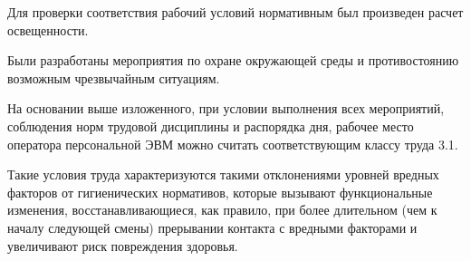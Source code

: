 Для проверки соответствия рабочий условий нормативным был произведен расчет освещенности.

Были разработаны мероприятия по охране окружающей среды и противостоянию возможным чрезвычайным ситуациям.

На основании выше изложенного, при условии выполнения всех мероприятий, соблюдения норм трудовой дисциплины и распорядка дня, рабочее место оператора персональной ЭВМ можно считать соответствующим классу труда 3.1.

Такие условия труда характеризуются такими отклонениями уровней вредных факторов от гигиенических нормативов, которые вызывают функциональные изменения, восстанавливающиеся, как правило, при более длительном (чем к началу следующей смены) прерывании контакта с вредными факторами и увеличивают риск повреждения здоровья.

\clearpage
\newpage